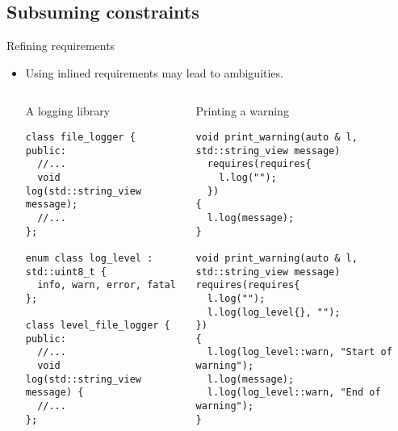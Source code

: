 \subsection{Subsuming constraints}

\begin{frame}[t,fragile]{Refining requirements}
\begin{itemize}
  \item Using inlined requirements may lead to ambiguities.

\begin{columns}[T]

\begin{block}{A logging library}
\begin{lstlisting}[basicstyle=\tiny]
class file_logger {
public:
  //...
  void log(std::string_view message);
  //...
};

enum class log_level : std::uint8_t { 
  info, warn, error, fatal };

class level_file_logger {
public:
  //...
  void log(std::string_view message) {
  //...
};
\end{lstlisting}
\end{block}

\begin{block}{Printing a warning}
\begin{lstlisting}[basicstyle=\tiny]
void print_warning(auto & l, std::string_view message)
  requires(requires{
    l.log("");
  })
{
  l.log(message);
}

void print_warning(auto & l, std::string_view message)
requires(requires{
  l.log("");
  l.log(log_level{}, "");
})
{
  l.log(log_level::warn, "Start of warning");
  l.log(message);
  l.log(log_level::warn, "End of warning");
}
\end{lstlisting}
\end{block}

\end{columns}

\end{itemize}
\end{frame}

